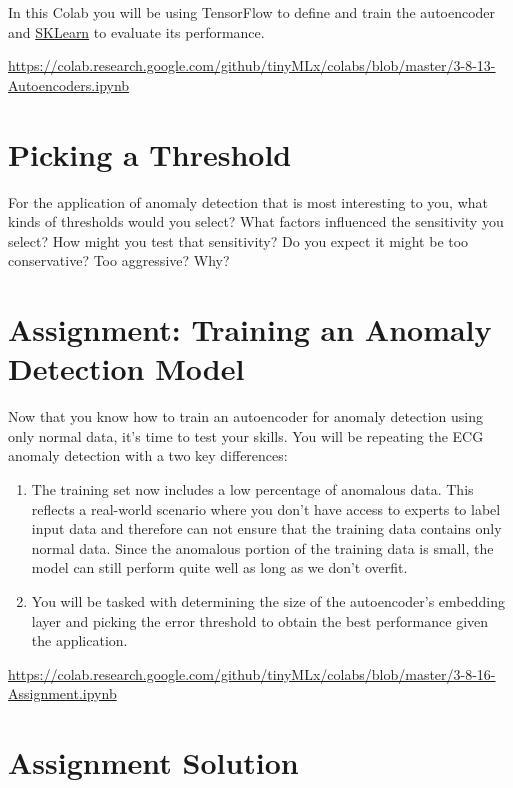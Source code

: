In this Colab you will be using TensorFlow to define and train the autoencoder and \href{https://scikit-learn.org/stable/modules/model_evaluation.html}{SKLearn} to evaluate its performance.

\url{https://colab.research.google.com/github/tinyMLx/colabs/blob/master/3-8-13-Autoencoders.ipynb}

\section{Picking a Threshold}

For the application of anomaly detection that is most interesting to you, what kinds of thresholds would you select? What factors influenced the sensitivity you select? How might you test that sensitivity? Do you expect it might be too conservative? Too aggressive? Why?

\section{Assignment: Training an Anomaly Detection Model}

Now that you know how to train an autoencoder for anomaly detection using only normal data, it’s time to test your skills. You will be repeating the ECG anomaly detection with a two key differences:

\begin{enumerate}
  \item The training set now includes a low percentage of anomalous data. This reflects a real-world scenario where you don’t have access to experts to label input data and therefore can not ensure that the training data contains only normal data. Since the anomalous portion of the training data is small, the model can still perform quite well as long as we don’t overfit.

  \item You will be tasked with determining the size of the autoencoder’s embedding layer and picking the error threshold to obtain the best performance given the application.
\end{enumerate}

\url{https://colab.research.google.com/github/tinyMLx/colabs/blob/master/3-8-16-Assignment.ipynb}

\section{Assignment Solution}

